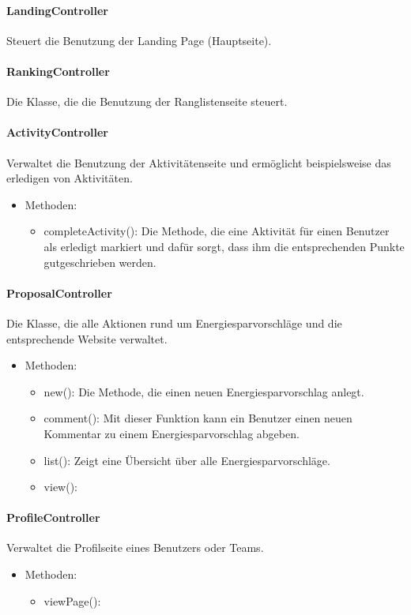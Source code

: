	\paragraph{LandingController}Steuert die Benutzung der Landing Page (Hauptseite).
	\paragraph{RankingController}Die Klasse, die die Benutzung der Ranglistenseite steuert.
	\paragraph{ActivityController}Verwaltet die Benutzung der Aktivit\"atenseite und erm\"oglicht beispielsweise das erledigen von Aktivit\"aten.
		\begin{itemize}
			\item Methoden:
			\begin{itemize}
				\item completeActivity(): Die Methode, die eine Aktivit\"at f\"ur einen Benutzer als erledigt markiert und daf\"ur sorgt, dass ihm die entsprechenden Punkte gutgeschrieben werden.
			\end{itemize}
		\end{itemize}
	\paragraph{ProposalController}Die Klasse, die alle Aktionen rund um Energiesparvorschl\"age und die entsprechende Website verwaltet.
		\begin{itemize}
			\item Methoden:
			\begin{itemize}
				\item new(): Die Methode, die einen neuen Energiesparvorschlag anlegt.
				\item comment(): Mit dieser Funktion kann ein Benutzer einen neuen Kommentar zu einem Energiesparvorschlag abgeben.
				\item list(): Zeigt eine \"Ubersicht \"uber alle Energiesparvorschl\"age.
				\item view(): %
			\end{itemize}
		\end{itemize}
	\paragraph{ProfileController}Verwaltet die Profilseite eines Benutzers oder Teams.
		\begin{itemize}
			\item Methoden:
			\begin{itemize}
				\item viewPage(): %
			\end{itemize}
		\end{itemize}
